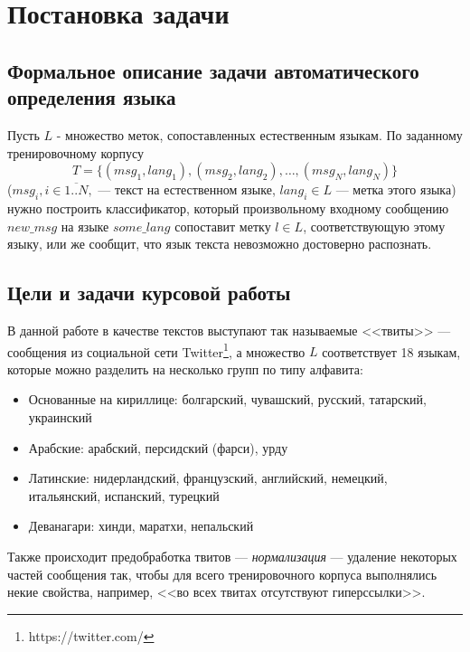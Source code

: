 \documentclass[a4paper, 14pt]{article}
\begin{document}
\pagebreak	        
	        
\section{Постановка задачи}
		\subsection{Формальное описание задачи автоматического определения языка}
		Пусть $L$ - множество меток, сопоставленных естественным языкам.
		По заданному тренировочному корпусу $$ T = \{(msg_{1}, lang_{1}), (msg_{2}, lang_{2}), \ldots, (msg_{N}, lang_{N}) \} $$
		($msg_{i}, i \in \overline{1..N},$ --- текст на естественном языке, $lang_{i} \in L$ --- метка этого языка) нужно построить классификатор,
		который произвольному входному сообщению $new\_msg$ на языке $some\_lang$ сопоставит метку $l \in L$, соответствующую этому языку,
		 или же сообщит, что язык текста невозможно достоверно распознать.
		\subsection{Цели и задачи курсовой работы}
		В данной работе в качестве текстов выступают так называемые <<твиты>> --- сообщения из социальной сети Twitter\footnote{https://twitter.com/}, 
		а множество $L$ соответствует 18 языкам, которые можно разделить на несколько групп по типу алфавита:
		\begin{itemize}
			\item Основанные на кириллице: болгарский, чувашский, русский, татарский, украинский
			\item Арабские: арабский, персидский (фарси), урду
			\item Латинские: нидерландский, французский, английский, немецкий, итальянский, испанский, турецкий
			\item Деванагари: хинди, маратхи, непальский
		\end{itemize}
		Также происходит предобработка твитов --- \textit{нормализация} --- удаление некоторых частей сообщения так, чтобы для всего тренировочного корпуса выполнялись некие свойства, например, <<во всех твитах отсутствуют гиперссылки>>.
		
\end{document}
